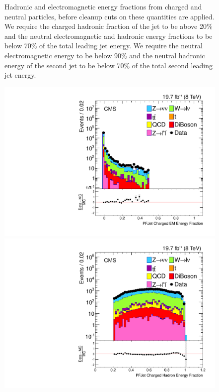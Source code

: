 \begin{figure}[!Hhtb]
\begin{center}
  \caption{Hadronic and electromagnetic energy fractions from charged 
and neutral particles, before cleanup cuts on these quantities are 
applied.  We require the charged 
hadronic fraction of the jet to be above 20\% and the neutral electromagnetic and hadronic energy fractions to be below 70\% of the total leading jet energy.
We require the neutral electromagnetic energy to be below 90\% and the neutral hadronic energy of the second jet to be below 70\% of the total second leading jet energy. }
         \label{fig:ANA_energy_fraction_cleanup}
  \end{center}
\end{figure}
%
\begin{figure}[!Hhtb]
  \begin{center}
  \includegraphics[scale=0.30]     {Figures/sus13009/cut/PFAK5JetChaEmEngFrac.pdf}
  \includegraphics[scale=0.30]     {Figures/sus13009/cut/PFAK5JetChaHadEngFrac.pdf}

\end{center}
\end{figure}
